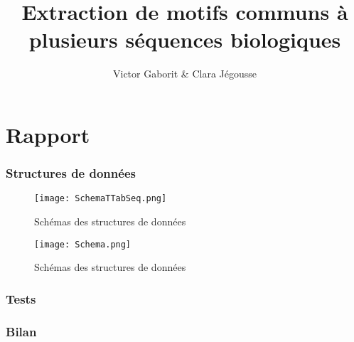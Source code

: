 \documentclass[11pt, oneside]{article}
\title{Extraction de motifs communs à plusieurs séquences biologiques}
\author{Victor Gaborit \& Clara Jégousse}
\date{}
\begin{document}

\maketitle

\setcounter{tocdepth}{3}
\tableofcontents
\clearpage

\part*{Rapport}

\section{Structures de données} 


\begin{figure}[h!]
\centering
  \texttt{[image: SchemaTTabSeq.png]}
\caption{Schémas des structures de données}
\label{fig:structure_donnees_dictionnaire}
\end{figure}

\begin{figure}[h!]
\centering
  \texttt{[image: Schema.png]}
\caption{Schémas des structures de données}
\label{fig:structure_donnees_dictionnaire}
\end{figure}
\newpage

\section{Tests}

%

\section{Bilan}

\end{document}
